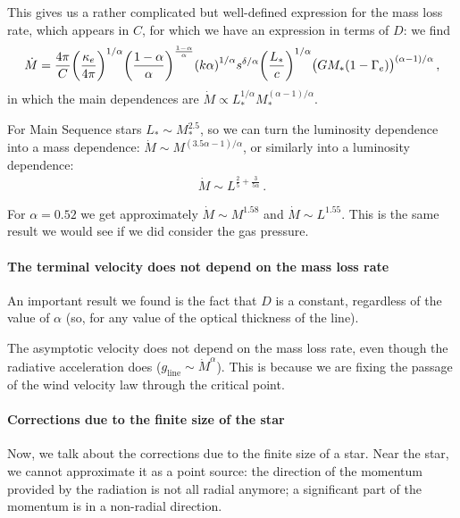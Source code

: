 \documentclass[main.tex]{subfiles}
\begin{document}
This gives us a rather complicated but well-defined expression for the mass loss rate, which appears in \(C\), for which we have an expression in terms of \(D\): we find
%
\begin{align}
\dot{M} = \frac{4 \pi }{C} \qty(\frac{\kappa_{e}}{4 \pi})^{1/\alpha } \qty(\frac{1-\alpha }{\alpha })^{\frac{1-\alpha }{\alpha }} \qty(k \alpha )^{1/\alpha }
s^{ \delta / \alpha } \qty(\frac{L_{*}}{c})^{1/\alpha }
\qty(GM_{*} (1-\Gamma_{e}))^{(\alpha -1) / \alpha }
\,,
\end{align}
in which the main dependences are \(\dot{M} \propto L_{*}^{ 1/ \alpha } M_{*}^{(\alpha - 1 ) / \alpha }\).

For Main Sequence stars \(L_{*} \sim M_{*}^{2.5}\), so we can turn the luminosity dependence into a mass dependence: \(\dot{M} \sim M^{(3.5 \alpha  - 1 ) / \alpha }\), or similarly into a luminosity dependence: 
%
\begin{align}
\dot{M} \sim L^{\frac{2}{5} + \frac{3}{5 \alpha }}
\,.
\end{align}
%

For \(\alpha = 0.52\) we get approximately \(\dot{M} \sim M^{1.58}\) and \(\dot{M} \sim L^{1.55}\).
This is the same result we would see if we did consider the gas pressure.

\paragraph{The terminal velocity does not depend on the mass loss rate}
An important result we found is the fact that \(D\) is a constant, regardless of the value of \(\alpha \) (so, for any value of the optical thickness of the line). 

The asymptotic velocity does not depend on the mass loss rate, even though the radiative acceleration does (\(g _{\text{line}} \sim \dot{M}^{\alpha }\)).
This is because we are fixing the passage of the wind velocity law through the critical point.

\paragraph{Corrections due to the finite size of the star}

Now, we talk about the corrections due to the finite size of a star. Near the star, we cannot approximate it as a point source: the direction of the momentum provided by the radiation is not all radial anymore; a significant part of the momentum is in a non-radial direction.
\end{document}
